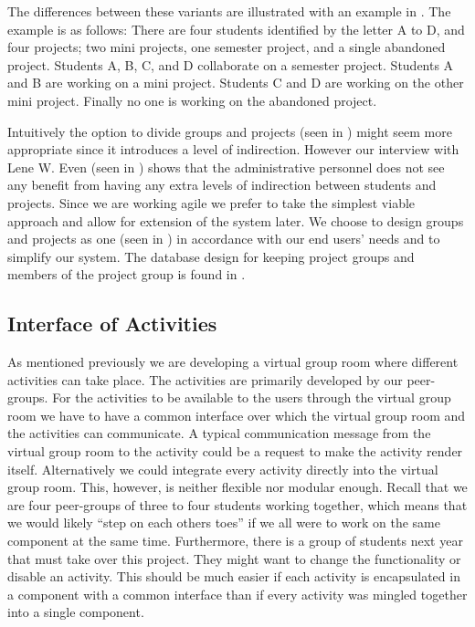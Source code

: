The differences between these variants are illustrated with an example in .
The example is as follows:
There are four students identified by the letter A to D, and four projects; two mini projects, one semester project, and a single abandoned project.
Students A, B, C, and D collaborate on a semester project.
Students A and B are working on a mini project.
Students C and D are working on the other mini project.
Finally no one is working on the abandoned project.

Intuitively the option to divide groups and projects (seen in ) might seem more appropriate since it introduces a level of indirection.
However our interview with Lene W. Even (seen in ) shows that the administrative personnel does not see any benefit from having any extra levels of indirection between students and projects.
Since we are working agile we prefer to take the simplest viable approach and allow for extension of the system later.
We choose to design groups and projects as one (seen in ) in accordance with our end users' needs and to simplify our system.
The database design for keeping project groups and members of the project group is found in .

\subsection{Interface of Activities}
\label{sub:interActivities}
As mentioned previously we are developing a virtual group room where different activities can take place.
The activities are primarily developed by our peer-groups.
For the activities to be available to the users through the virtual group room we have to have a common interface over which the virtual group room and the activities can communicate.
A typical communication message from the virtual group room to the activity could be a request to make the activity render itself.
Alternatively we could integrate every activity directly into the virtual group room.
This, however, is neither flexible nor modular enough.
Recall that we are four peer-groups of three to four students working together, which means that we would likely ``step on each others toes'' if we all were to work on the same component at the same time.
Furthermore, there is a group of students next year that must take over this project.
They might want to change the functionality or disable an activity.
This should be much easier if each activity is encapsulated in a component with a common interface than if every activity was mingled together into a single component.

